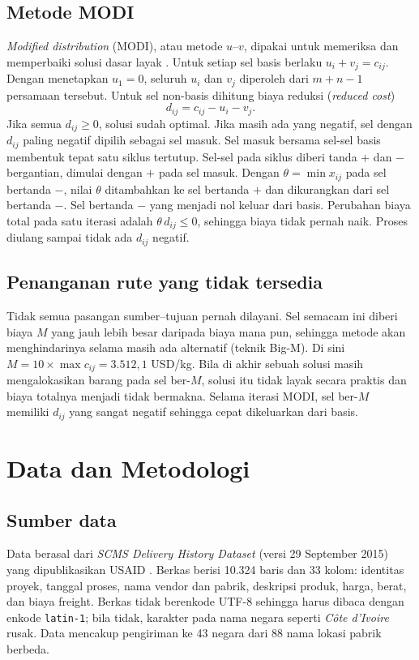 \documentclass[a4paper,11pt]{article}
\begin{document}
\subsection{Metode MODI}
\textit{Modified distribution} (MODI), atau metode $u$--$v$, dipakai untuk memeriksa dan memperbaiki solusi dasar layak \cite{taha2017,hillier2021}. Untuk setiap sel basis berlaku $u_i+v_j=c_{ij}$. Dengan menetapkan $u_1=0$, seluruh $u_i$ dan $v_j$ diperoleh dari $m+n-1$ persamaan tersebut. Untuk sel non-basis dihitung biaya reduksi (\textit{reduced cost})
\begin{equation}
d_{ij}=c_{ij}-u_i-v_j .
\label{eq:dij}
\end{equation}
Jika semua $d_{ij}\ge 0$, solusi sudah optimal. Jika masih ada yang negatif, sel dengan $d_{ij}$ paling negatif dipilih sebagai sel masuk. Sel masuk bersama sel-sel basis membentuk tepat satu siklus tertutup. Sel-sel pada siklus diberi tanda $+$ dan $-$ bergantian, dimulai dengan $+$ pada sel masuk. Dengan $\theta=\min x_{ij}$ pada sel bertanda $-$, nilai $\theta$ ditambahkan ke sel bertanda $+$ dan dikurangkan dari sel bertanda $-$. Sel bertanda $-$ yang menjadi nol keluar dari basis. Perubahan biaya total pada satu iterasi adalah $\theta\,d_{ij}\le 0$, sehingga biaya tidak pernah naik. Proses diulang sampai tidak ada $d_{ij}$ negatif.

\subsection{Penanganan rute yang tidak tersedia}
Tidak semua pasangan sumber--tujuan pernah dilayani. Sel semacam ini diberi biaya $M$ yang jauh lebih besar daripada biaya mana pun, sehingga metode akan menghindarinya selama masih ada alternatif (teknik Big-M). Di sini $M=10\times\max c_{ij}=3.512{,}1$ USD/kg. Bila di akhir sebuah solusi masih mengalokasikan barang pada sel ber-$M$, solusi itu tidak layak secara praktis dan biaya totalnya menjadi tidak bermakna. Selama iterasi MODI, sel ber-$M$ memiliki $d_{ij}$ yang sangat negatif sehingga cepat dikeluarkan dari basis.

\section{Data dan Metodologi}
\label{sec:metode}

\subsection{Sumber data}
Data berasal dari \textit{SCMS Delivery History Dataset} (versi 29 September 2015) yang dipublikasikan USAID \cite{usaid2015}. Berkas berisi 10.324 baris dan 33 kolom: identitas proyek, tanggal proses, nama vendor dan pabrik, deskripsi produk, harga, berat, dan biaya freight. Berkas tidak berenkode UTF-8 sehingga harus dibaca dengan enkode \texttt{latin-1}; bila tidak, karakter pada nama negara seperti \textit{C\^ote d'Ivoire} rusak. Data mencakup pengiriman ke 43 negara dari 88 nama lokasi pabrik berbeda.
\end{document}
